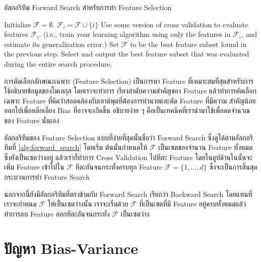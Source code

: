 \begin{algorithm}[ht]
    \caption{อัลกอริทึม Forward Search สำหรับการทำ Feature Selection}
    \label{alg:forward_search}
    \begin{algorithmic}
    \State Initialize $\mathcal{F} = \emptyset$.
    \Repeat
                \State $\mathcal{F}_i = \mathcal{F} \cup \{i\}$
                \State Use some version of cross validation to evaluate features $\mathcal{F}_i$.
                \State (i.e., train your learning algorithm using only the features in $\mathcal{F}_i$, and 
                estimate its generalization error.)
            \EndIf
        \EndFor
        \State Set $\mathcal{F}$ to be the best feature subset found in the previous step. %
    \State Select and output the best feature subset that was evaluated during the entire search procedure.
    \end{algorithmic}
\end{algorithm}

การคัดเลือกลักษณะเฉพาะ (Feature Selection) เป็นการหา Feature ที่เหมาะสมที่สุดสำหรับการใช้อธิบายข้อมูลของโมเลกุล โดยเราจะทำการ%
เรียงลำดับความสำคัญของ Feature แล้วทำการคัดเลือกเฉพาะ Feature ที่คิดว่าสอดคล้องกับเอาต์พุตที่ต้องการทำนายและคัด Feature ที่มีความ%
สำคัญน้อยออกไปเพื่อหลีกเลี่ยง Bias ที่อาจจะเกิดขึ้น อธิบายง่าย ๆ คือเป็นเทคนิคที่เรานำมาใช้เพื่อลดจำนวณของ Feature นั่นเอง 

อัลกอริทึมของ Feature Selection แบบที่ง่ายที่สุดนั้นชื่อว่า Forward Search ซึ่งดูได้ตามอัลกอริทึมที่ \ref{alg:forward_search} โดยเริ่ม%
ต้นนั้นกำหนดให้ $\mathcal{F}$ เป็นเซตของจำนวน Feature ทั้งหมดซึ่งยังเป็นเซตว่างอยู่ แล้วเราก็ทำการ Cross Validation ไปทีละ Feature
โดยในลูปด้านในนั้นจะเพิ่ม Feature เข้าไปใน $\mathcal{F}$ ทีละอันจนกระทั้งครบทุก Feature $\mathcal{F} = \{1,\ldots ,d\}$ 
ซึ่งจะเป็นการสิ้นสุดกระบวนการทำ Feature Search 

นอกจากนี้ยังมีอัลกอริทึมที่ตรงข้ามกับ Forward Search เรียกว่า Backward Search โดยแทนที่เราจะกำหนด $\mathcal{F}$ ให้เป็นเซตว่างนั้น%
เราจะเริ่มด้วย $\mathcal{F}$ ที่เป็นเซตที่มี Feature อยู่ครบทั้งหมดแล้วทำการลบ Feature ออกทีละอันจนกระทั่ง $\mathcal{F}$ เป็นเซตว่าง

\section{ปัญหา Bias-Variance}
\label{sec:bias_var_prob}

